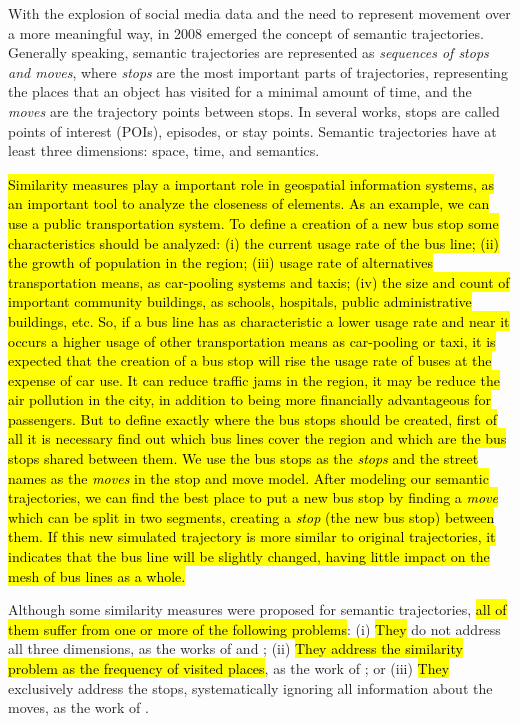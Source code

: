 \documentclass[12pt]{article}
\begin{document}
With the explosion of social media data and the need to represent movement over a more meaningful way, in 2008 emerged the concept of semantic trajectories\cite{Spaccapietra:2008:CVT:1347466.1347785}. Generally speaking, semantic trajectories are represented as \emph{sequences of stops and moves}, where \emph{stops} are the most important parts of trajectories, representing the places that an object has visited for a minimal amount of time, and the \emph{moves} are the trajectory points between stops. In several works, stops are called points of interest (POIs), episodes, or stay points. Semantic trajectories have at least three dimensions: space, time, and semantics.

\hl{Similarity measures play a important role in geospatial information systems, as an important tool to analyze the closeness of elements. As an example, we can use a public transportation system. To define a creation of a new bus stop some characteristics should be analyzed: (i) the current usage rate of the bus line; (ii) the growth of population in the region; (iii) usage rate of alternatives transportation means, as car-pooling systems and taxis; (iv) the size and count of important community buildings, as schools, hospitals, public administrative buildings, etc. So, if a bus line has as characteristic a lower usage rate and near it occurs a higher usage of other transportation means as car-pooling or taxi, it is expected that the creation of a bus stop will rise the usage rate of buses at the expense of car use. It can reduce traffic jams in the region, it may be reduce the air pollution in the city, in addition to being more financially advantageous for passengers. But to define exactly where the bus stops should be created, first of all it is necessary find out which bus lines cover the region and which are the bus stops shared between them. We use the bus stops as the \emph{stops} and the street names as the \emph{moves} in the stop and move model. After modeling our semantic trajectories, we can find the best place to put a new bus stop by finding a \emph{move} which can be split in two segments, creating a \emph{stop} (the new bus stop) between them. If this new simulated trajectory is more similar to original trajectories, it indicates that the bus line will be slightly changed, having little impact on the mesh of bus lines as a whole.}

Although some similarity measures were proposed for semantic trajectories, {\hl{all of them suffer from one or more of the following problems}}: (i) {\hl{They}} do not address all three dimensions, as the works of \cite{Kang:2009:SMT:1529282.1529580} and \cite{Liu:2012:SMM:2442968.2442971}; (ii) {\hl{They address the similarity problem as the frequency of visited places}}, as the work of \cite{Ying:2010:MUS:1867699.1867703}; or (iii) {\hl{They}} exclusively address the stops, systematically ignoring all information about the moves, as the work of \cite{Furtado:TGIS12156}.
\end{document}
